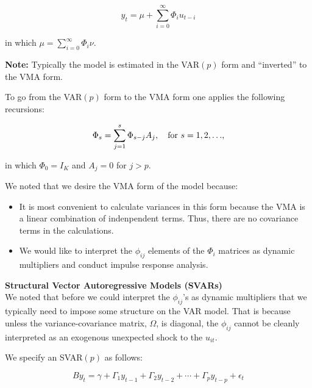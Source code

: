 \documentclass[11pt]{article}
\begin{document}
\vspace{3.5mm}
\begin{equation*}
y_{t} = \mu + \sum\limits_{i=0}^{\infty} \Phi_{i} u_{t-i}
\end{equation*}

in which $\mu = \sum\limits_{i=0}^{\infty} \Phi_{i} \nu$.

\vspace{3mm}
\textbf{Note:} Typically the model is estimated in the VAR$(p)$ form and ``inverted'' to the VMA form.

\newpage
To go from the VAR$(p)$ form to the VMA form one applies the following recursions:\

\begin{equation*}
\Phi_{s} = \sum\limits_{j=1}^{s} \Phi_{s-j} A_{j}, \mbox{\quad for $s = 1, 2, \ldots$,}
\end{equation*}

in which $\Phi_{0} = I_{K}$ and $A_{j} = 0$ for $j > p$.

\vspace{3.5mm}
We noted that we desire the VMA form of the model because:
\begin{itemize}
 \item It is most convenient to calculate variances in this form because the VMA is a linear combination
       of indenpendent terms. Thus, there are no covariance terms in the calculations.
 \item We would like to interpret the $\phi_{ij}$ elements of the $\Phi_{i}$ matrices as dynamic multipliers 
       and conduct impulse response analysis. 
\end{itemize}


\vspace{10mm}
\textbf{Structural Vector Autoregressive Models (SVARs)} \\

\vspace{3.5mm}
We noted that before we could interpret the $\phi_{ij}$'s as dynamic multipliers that we typically need
to impose some structure on the VAR model. That is because unless the variance-covariance matrix, $\Omega$, 
is diagonal, the $\phi_{ij}$ cannot be cleanly interpreted as an exogenous unexpected shock to the $u_{it}$.


\vspace{3.5mm}
We specify an SVAR$(p)$ as follows:

\vspace{2mm}
\begin{equation*}
B y_{t} = \gamma + \Gamma_{1} y_{t-1} + \Gamma_{2} y_{t-2} + \cdots + \Gamma_{p} y_{t-p} + \epsilon_{t}
\end{equation*}
\end{document}
